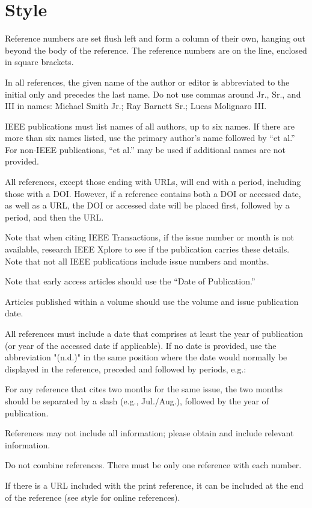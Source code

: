 \documentclass[10pt]{article}
\newcommand*{\guideexample}[1]{\par{\leftskip=36pt \bibentry{#1}\par}}
\begin{document}
\section{Style}
\begin{guideitems}
  \item Reference numbers are set flush left and form a column of their own, hanging out beyond the body of the reference. The reference numbers are on the line, enclosed in square brackets.
  \item In all references, the given name of the author or editor is abbreviated to the initial only and precedes the last name. Do not use commas around Jr., Sr., and III in names: Michael Smith Jr.; Ray Barnett Sr.; Lucas Molignaro III.
  \item IEEE publications must list names of all authors, up to six names. If there are more than six names listed, use the primary author’s name followed by “et al.” For non-IEEE publications, “et al.” may be used if additional names are not provided.
  \item All references, except those ending with URLs, will end with a period, including those with a DOI. However, if a reference contains both a DOI or accessed date, as well as a URL, the DOI or accessed date will be placed first, followed by a period, and then the URL.
  \item Note that when citing IEEE Transactions, if the issue number or month is not available, research IEEE Xplore to see if the publication carries these details. Note that not all IEEE publications include issue numbers and months.
  \item Note that early access articles should use the “Date of Publication.”
  \item Articles published within a volume should use the volume and issue publication date.
  \item All references must include a date that comprises at least the year of publication (or year of the accessed date if applicable). If no date is provided, use the abbreviation "(n.d.)" in the same position where the date would normally be displayed in the reference, preceded and followed by periods, e.g.:
\end{guideitems}
\guideexample{style:nodate}
\begin{guideitems}
  \item For any reference that cites two months for the same issue, the two months should be separated by a slash (e.g., Jul./Aug.), followed by the year of publication.
  \item References may not include all information; please obtain and include relevant information.
  \item Do not combine references. There must be only one reference with each number.
  \item If there is a URL included with the print reference, it can be included at the end of the reference (see style for online references).
\end{guideitems}
\end{document}
